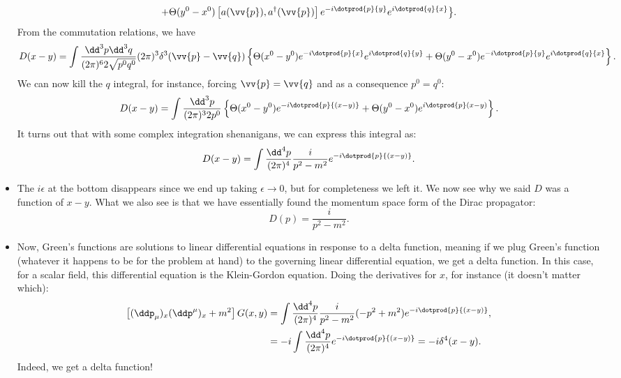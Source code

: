 \begin{itemize}
\begin{multline*}
            + \Theta(y^0 - x^0)\left[ a(\vv{p}),a^{\dagger}(\vv{p}) \right]e^{-i\dotprod{p}{y}}e^{i\dotprod{q}{x}} \big\}.
        \end{multline*}
        From the commutation relations, we have
        \begin{equation*}
            D(x-y) = \int \frac{\dd^3p \dd^3q}{(2\pi)^6 2\sqrt{p^0q^0}} (2\pi)^3\delta^3(\vv{p}-\vv{q}) \left\{ \Theta(x^0 - y^0) e^{-i\dotprod{p}{x}}e^{i\dotprod{q}{y}} + \Theta(y^0 - x^0)e^{-i\dotprod{p}{y}}e^{i\dotprod{q}{x}} \right\}.
        \end{equation*}
        We can now kill the $q$ integral, for instance, forcing $\vv{p}=\vv{q}$ and as a consequence $p^0=q^0$:
        \begin{equation*}
            D(x-y) = \int \frac{\dd^3p}{(2\pi)^3 2p^0} \left\{ \Theta(x^0 - y^0)e^{-i\dotprod{p}{(x-y)}} + \Theta(y^0 - x^0)e^{i\dotprod{p}(x-y)} \right\}.
        \end{equation*}
        It turns out that with some complex integration shenanigans, we can express this integral as:
        \begin{equation*}
            D(x-y) = \int \frac{\dd^4p}{(2\pi)^4} \frac{i}{p^2 - m^2}e^{-i\dotprod{p}{(x-y)}}.
        \end{equation*}
    \item The $i\epsilon$ at the bottom disappears since we end up taking $\epsilon \rightarrow 0$, but for completeness we left it. We now see why we said $D$ was a function of $x-y$. What we also see is that we have essentially found the momentum space form of the Dirac propagator:
        \begin{equation}
            \boxed{D(p) = \frac{i}{p^2 - m^2}.}
        \end{equation}
    \item Now, Green's functions are solutions to linear differential equations in response to a delta function, meaning if we plug Green's function (whatever it happens to be for the problem at hand) to the governing linear differential equation, we get a delta function. In this case, for a scalar field, this differential equation is the Klein-Gordon equation. Doing the derivatives for $x$, for instance (it doesn't matter which):
        \begin{align*}
            \left[ (\ddp_{\mu})_x(\ddp^{\mu})_x + m^2 \right]G(x,y) &= \int \frac{\dd^4p}{(2\pi)^4} \frac{i}{p^2 - m^2}(-p^2 + m^2) e^{-i\dotprod{p}{(x-y)}}, \\
            &= -i \int \frac{\dd^4p}{(2\pi)^4} e^{-i\dotprod{p}{(x-y)}} = -i\delta^4(x-y).
        \end{align*}
        Indeed, we get a delta function!
\end{itemize}


